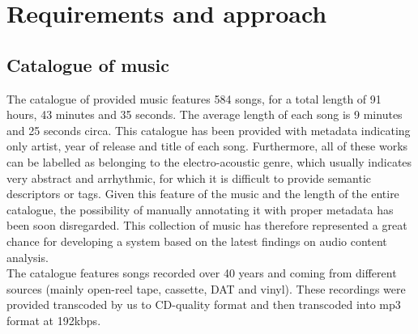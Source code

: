 \chapter{Requirements and approach} 

\label{Chapter4} 


\section{Catalogue of music}
\label{sec:catalogue}
The catalogue of provided music features 584 songs, for a total length of 91 hours, 43 minutes and 35 seconds. The average length of each song is 9 minutes and 25 seconds circa. This catalogue has been provided with metadata indicating only artist, year of release and title of each song. Furthermore, all of these works can be labelled as belonging to the electro-acoustic genre, which usually indicates very abstract and arrhythmic, for which it is difficult to provide semantic descriptors or tags. Given this feature of the music and the length of the entire catalogue, the possibility of manually annotating it with proper metadata has been soon disregarded. This collection of music has therefore represented a great chance for developing a system based on the latest findings on audio content analysis. \\The catalogue features songs recorded over 40 years and coming from different sources (mainly open-reel tape, cassette, DAT and vinyl). These recordings were provided transcoded by us to CD-quality format and then transcoded into mp3 format at 192kbps.

